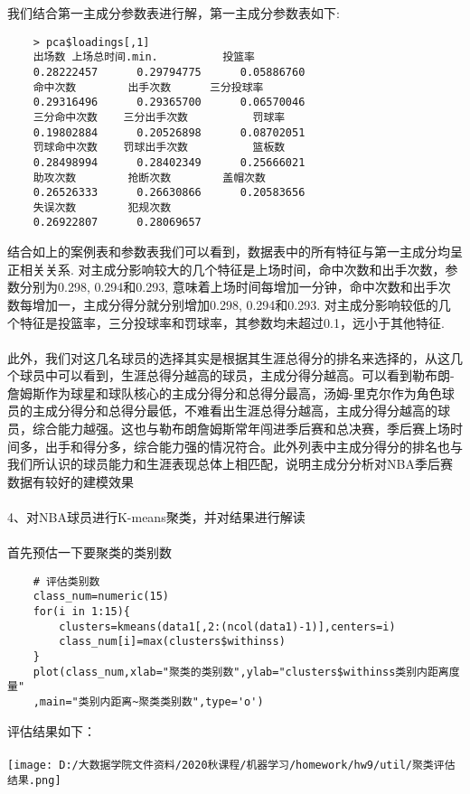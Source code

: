 \documentclass[]{article}
\begin{document}
我们结合第一主成分参数表进行解，第一主成分参数表如下:
\begin{lstlisting}
	> pca$loadings[,1]
	出场数 上场总时间.min.          投篮率 
	0.28222457      0.29794775      0.05886760 
	命中次数        出手次数      三分投球率 
	0.29316496      0.29365700      0.06570046 
	三分命中次数    三分出手次数          罚球率 
	0.19802884      0.20526898      0.08702051 
	罚球命中次数    罚球出手次数          篮板数 
	0.28498994      0.28402349      0.25666021 
	助攻次数        抢断次数        盖帽次数 
	0.26526333      0.26630866      0.20583656 
	失误次数        犯规次数 
	0.26922807      0.28069657 
\end{lstlisting}
结合如上的案例表和参数表我们可以看到，数据表中的所有特征与第一主成分均呈正相关关系. 对主成分影响较大的几个特征是上场时间，命中次数和出手次数，参数分别为0.298, 0.294和0.293, 意味着上场时间每增加一分钟，命中次数和出手次数每增加一，主成分得分就分别增加0.298, 0.294和0.293.
对主成分影响较低的几个特征是投篮率，三分投球率和罚球率，其参数均未超过0.1，远小于其他特征.\\\\
此外，我们对这几名球员的选择其实是根据其生涯总得分的排名来选择的，从这几个球员中可以看到，生涯总得分越高的球员，主成分得分越高。可以看到勒布朗-詹姆斯作为球星和球队核心的主成分得分和总得分最高，汤姆-里克尔作为角色球员的主成分得分和总得分最低，不难看出生涯总得分越高，主成分得分越高的球员，综合能力越强。这也与勒布朗詹姆斯常年闯进季后赛和总决赛，季后赛上场时间多，出手和得分多，综合能力强的情况符合。此外列表中主成分得分的排名也与我们所认识的球员能力和生涯表现总体上相匹配，说明主成分分析对NBA季后赛数据有较好的建模效果\\\\
4、对NBA球员进行K-means聚类，并对结果进行解读\\\\
首先预估一下要聚类的类别数
\begin{lstlisting}
	# 评估类别数
	class_num=numeric(15)
	for(i in 1:15){
		clusters=kmeans(data1[,2:(ncol(data1)-1)],centers=i)
		class_num[i]=max(clusters$withinss)
	}
	plot(class_num,xlab="聚类的类别数",ylab="clusters$withinss类别内距离度量"
	,main="类别内距离~聚类类别数",type='o')

\end{lstlisting}
评估结果如下：\\\\
\texttt{[image: D:/大数据学院文件资料/2020秋课程/机器学习/homework/hw9/util/聚类评估结果.png]}\\\\
\end{document}
